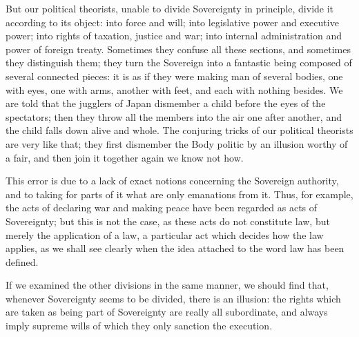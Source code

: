 \documentclass[12pt]{book}
\begin{document}
But our political theorists, unable to divide Sovereignty in principle, divide it according to its object: into force and will; into legislative power and executive power; into rights of taxation, justice and war; into internal administration and power of foreign treaty. Sometimes they confuse all these sections, and sometimes they distinguish them; they turn the Sovereign into a fantastic being composed of several connected pieces: it is as if they were making man of several bodies, one with eyes, one with arms, another with feet, and each with nothing besides. We are told that the jugglers of Japan dismember a child before the eyes of the spectators; then they throw all the members into the air one after another, and the child falls down alive and whole. The conjuring tricks of our political theorists are very like that; they first dismember the Body politic by an illusion worthy of a fair, and then join it together again we know not how.

This error is due to a lack of exact notions concerning the Sovereign authority, and to taking for parts of it what are only emanations from it. Thus, for example, the acts of declaring war and making peace have been regarded as acts of Sovereignty; but this is not the case, as these acts do not constitute law, but merely the application of a law, a particular act which decides how the law applies, as we shall see clearly when the idea attached to the word law has been defined.

If we examined the other divisions in the same manner, we should find that, whenever Sovereignty seems to be divided, there is an illusion: the rights which are taken as being part of Sovereignty are really all subordinate, and always imply supreme wills of which they only sanction the execution.
\end{document}
